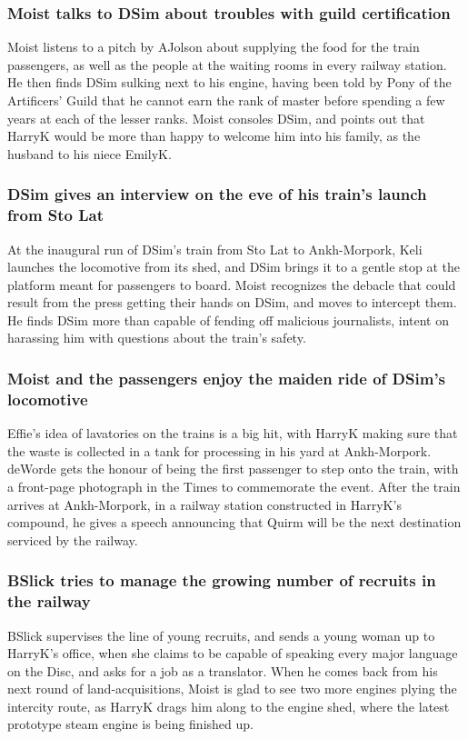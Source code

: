 \subsubsection{\Gls{Moist} talks to \Gls{DSim} about troubles with guild certification}
\Gls{Moist} listens to a pitch by \Gls{AJolson} about supplying the food for the train passengers,
as well as the people at the waiting rooms in every railway station. He then finds \Gls{DSim}
sulking next to his engine, having been told by \Gls{Pony} of the Artificers' Guild that he cannot
earn the rank of master before spending a few years at each of the lesser ranks. \Gls{Moist}
consoles \Gls{DSim}, and points out that \Gls{HarryK} would be more than happy to welcome him into
his family, as the husband to his niece \Gls{EmilyK}.

\subsubsection{\Gls{DSim} gives an interview on the eve of his train's launch from Sto Lat}
At the inaugural run of \Gls{DSim}'s train from Sto Lat to Ankh-Morpork, \Gls{Keli} launches the
locomotive from its shed, and \Gls{DSim} brings it to a gentle stop at the platform meant for
passengers to board. \Gls{Moist} recognizes the debacle that could result from the press getting
their hands on \Gls{DSim}, and moves to intercept them. He finds \Gls{DSim} more than capable of
fending off malicious journalists, intent on harassing him with questions about the train's safety.

\subsubsection{\Gls{Moist} and the passengers enjoy the maiden ride of \Gls{DSim}'s locomotive}
\Gls{Effie}'s idea of lavatories on the trains is a big hit, with \Gls{HarryK} making sure that the
waste is collected in a tank for processing in his yard at Ankh-Morpork. \Gls{deWorde} gets the
honour of being the first passenger to step onto the train, with a front-page photograph in the
Times to commemorate the event. After the train arrives at Ankh-Morpork, in a railway station
constructed in \Gls{HarryK}'s compound, he gives a speech announcing that Quirm will be the next
destination serviced by the railway.

\subsubsection{\Gls{BSlick} tries to manage the growing number of recruits in the railway}
\Gls{BSlick} supervises the line of young recruits, and sends a young woman up to \Gls{HarryK}'s
office, when she claims to be capable of speaking every major language on the Disc, and asks for a
job as a translator. When he comes back from his next round of land-acquisitions, \Gls{Moist}
is glad to see two more engines plying the intercity route, as \Gls{HarryK} drags him along to
the engine shed, where the latest prototype steam engine is being finished up.

